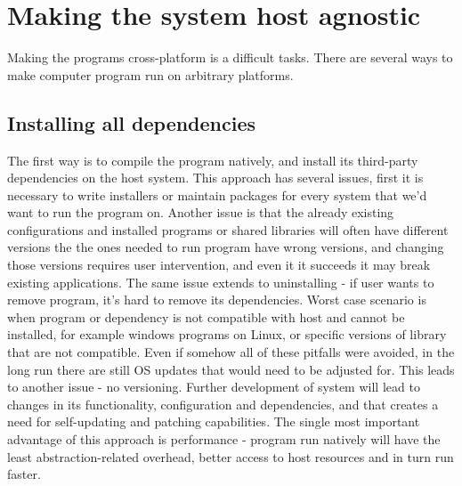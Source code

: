 \section{Making the system host agnostic}
Making the programs cross-platform is a difficult tasks. There are several ways to make computer program run on arbitrary platforms.
\subsection{Installing all dependencies}
The first way is to compile the program natively, and install its third-party dependencies on the host system. This approach has several issues, first it is necessary to write installers or maintain packages for every system that we'd want to run the program on. Another issue is that the already existing configurations and installed programs or shared libraries will often have different versions the the ones needed to run program have wrong versions, and changing those versions requires user intervention, and even it it succeeds it may break existing applications. The same issue extends to uninstalling - if user wants to remove program, it's hard to remove its dependencies. Worst case scenario is when program or dependency is not compatible with host and cannot be installed, for example windows programs on Linux, or specific versions of library that are not compatible. Even if somehow all of these pitfalls were avoided, in the long run there are still OS updates that would need to be adjusted for. This leads to another issue - no versioning. Further development of system will lead to changes in its functionality, configuration and dependencies, and that creates a need for self-updating and patching capabilities.  The single most important advantage of this approach is performance - program run natively will have the least abstraction-related overhead, better access to host resources and in turn run faster. 
